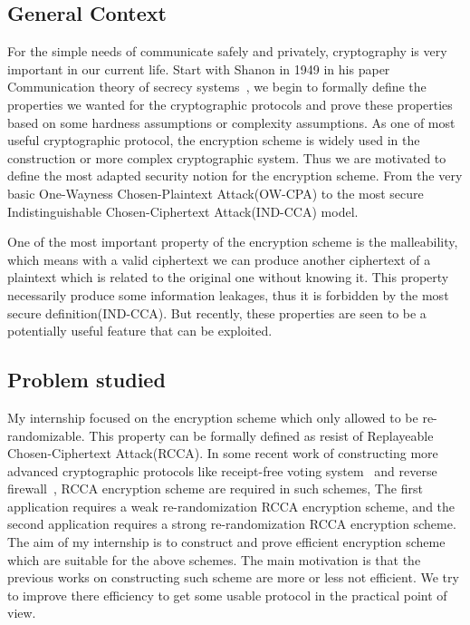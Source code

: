 \subsection*{General Context}

For the simple needs of communicate safely and privately, cryptography is very important in our current life. 
Start with Shanon in 1949 in his paper Communication theory of secrecy systems~\cite{shannon-otp},
we begin to formally define the properties we wanted for the cryptographic protocols and prove these properties based on some hardness assumptions or complexity assumptions.
As one of most useful cryptographic protocol, the encryption scheme is widely used in the construction or more complex cryptographic system.
Thus we are motivated to define the most adapted security notion for the encryption scheme. 
From the very basic One-Wayness Chosen-Plaintext Attack(OW-CPA) to the most secure Indistinguishable Chosen-Ciphertext Attack(IND-CCA) model. 

One of the most important property of the encryption scheme is the malleability, 
which means with a valid ciphertext we can produce another ciphertext of a plaintext which is related to the original one without knowing it.
This property necessarily produce some information leakages,
thus it is forbidden by the most secure definition(IND-CCA).
But recently, these properties are seen to be a potentially useful feature that can be exploited.

\subsection*{Problem studied}
My internship focused on the encryption scheme which only allowed to be re-randomizable.
This property can be formally defined as resist of Replayeable Chosen-Ciphertext Attack(RCCA).
In some recent work of constructing more advanced cryptographic protocols like receipt-free voting system~\cite{cryptoeprint:2015:629} and reverse firewall~\cite{DBLP:conf/crypto/DodisMS16},
RCCA encryption scheme are required in such schemes,
The first application requires a weak re-randomization RCCA encryption scheme,
and the second application requires a strong re-randomization RCCA encryption scheme.
The aim of my internship is to construct and prove efficient encryption scheme which are suitable for the above schemes.
The main motivation is that the previous works on constructing such scheme are more or less not efficient.
We try to improve there efficiency to get some usable protocol in the practical point of view.

